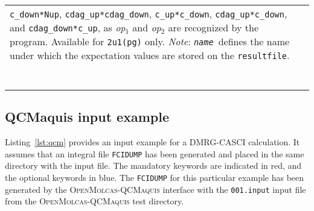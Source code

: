 \documentclass[bibliography=totoc,12pt,a4paper]{scrartcl}
\newcommand{\mol}{\textsc{OpenMolcas}}
\newcommand{\qcm}{\textsc{QCMaquis}}
\begin{document}
\begin{longtable}{ll}
{            \texttt{c\_down*Nup},
            \texttt{cdag\_up*cdag\_down},
            \texttt{c\_up*c\_down},
            \texttt{cdag\_up*c\_down},
            and \texttt{cdag\_down*c\_up},
            as \textit{op$_1$} and \textit{op$_2$} are recognized by the program. Available for \texttt{2u1(pg)} only.\\
            \emph{Note}: \texttt{\textit{name}}\ defines the name under which the expectation values are stored on the \texttt{resultfile}.}\\
 & \\
 & \\
 & \\
 & \\
 & \\
 & \\
 & \\
\bottomrule
\end{longtable}
\FloatBarrier

\subsection{QCMaquis input example}
\label{sec:input-qcm}

Listing~\ref{lst:qcm} provides an input example for a DMRG-CASCI calculation.
It assumes that an integral file \texttt{FCIDUMP} has been generated and placed in the same directory with the input file.
The mandatory keywords are indicated in red, and the optional keywords in blue.
The \texttt{FCIDUMP} for this particular example has been generated by the \mol-\qcm{} interface with the \texttt{001.input} input file from the \mol-\qcm{} test directory.
\end{document}
